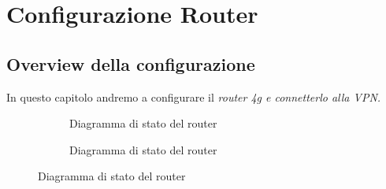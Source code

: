 
\chapter{Configurazione Router}

\section{Overview della configurazione}

In questo capitolo andremo a configurare il \it{router 4g} e connetterlo alla VPN.

\newsavebox{\myimage}

\begin{figure}[H]
    \centering%
    \begin{subfigure}{0.4\textwidth}
        \centering
        \usebox{\myimage}
        \caption{Diagramma di stato del router}
        \label{fig:diag-router}
    \end{subfigure}
    \hfill%
    \begin{subfigure}{0.5\textwidth}
        \centering
        \caption{Diagramma di stato del router}
        \label{fig:diag-router1}
    \end{subfigure}
\end{figure}


